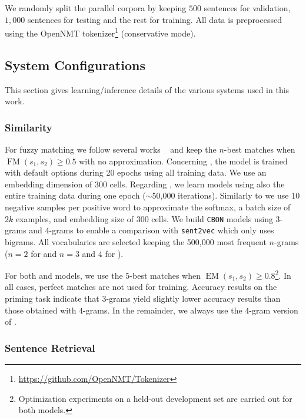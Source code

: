 We randomly split the parallel corpora by keeping $500$ sentences for validation, $1,000$ sentences for testing and the rest for training.
All data is preprocessed using the OpenNMT tokenizer\footnote{\url{https://github.com/OpenNMT/Tokenizer}} (conservative mode). 

\subsection{System Configurations}
\label{ssec:config-chap8}

This section gives learning/inference details of the various systems used in this work.

\subsubsection*{Similarity} 

For fuzzy matching  we follow several works ~\cite{Koehn10convergence,bulte19neural,xu20boosting} and keep the $n$-best matches when $\operatorname{FM}(s_1,s_2) \geq 0.5$ with no approximation.
%
Concerning , the model is trained with default options during 20 epochs using all training data. We use an embedding dimension of 300 cells. %
%
Regarding , we learn models using also the entire training data during one epoch ($\sim$50,000 iterations). Similarly to  we use $10$ negative samples per positive word to approximate the softmax, a batch size of $2k$ examples, and embedding size of 300 cells. 
%
We build \texttt{CBON} models using $3$-grams and $4$-grams to enable a comparison with \texttt{sent2vec} which only uses bigrams.
All vocabularies are selected keeping the 500,000 most frequent $n$-grams ($n=2$ for  and $n=3$ and $4$ for ).

For both  and  models, we use the $5$-best matches when $\operatorname{EM}(s_1,s_2) \geq 0.8$\footnote{Optimization experiments on a held-out development set are carried out for both models.}. 
In all cases, perfect matches are not used for training.
%
Accuracy results on the priming task indicate that $3$-grams yield slightly lower accuracy results than those obtained with $4$-grams. In the remainder, we always use the $4$-gram version of .

\subsubsection*{Sentence Retrieval}

